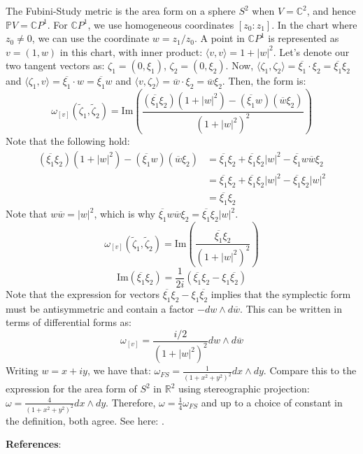 \begin{example}
The Fubini-Study metric is the area form on a sphere $S^{2}$ when $V = \mathbb{C}^2$, and hence $\mathbb{P}V = \mathbb{C}P^{1}$.
For $\mathbb{C}P^1$, we use homogeneous coordinates $[z_0:z_1]$. In the chart where $z_0 \neq 0$, we can use the coordinate $w = z_1/z_0$. A point in $\mathbb{C}P^1$ is represented as $v = (1, w)$ in this chart, with inner product: $\langle v, v \rangle = 1 + |w|^2$. Let's denote our two tangent vectors as: $\zeta_1 = (0, \xi_1)$, $\zeta_2 = (0, \xi_2)$. Now, $\langle \zeta_1, \zeta_2 \rangle = \overline{\xi_1} \cdot \xi_2 = \overline{\xi_1} \xi_2$ and $\langle \zeta_1, v \rangle = \overline{\xi_1} \cdot w = \overline{\xi_1} w$ and $\langle v, \zeta_2 \rangle = \overline{w} \cdot \xi_2 = \overline{w} \xi_2$. Then, the form is:
\begin{equation}
\omega_{[v]}(\tilde{\zeta}_1, \tilde{\zeta}_2) = \text{Im} \left( \frac{(\overline{\xi_1} \xi_2)(1 + |w|^2) - (\overline{\xi_1} w)(\overline{w} \xi_2)}{(1 + |w|^2)^2} \right)
\end{equation}
Note that the following hold:
\begin{align}
(\overline{\xi_1} \xi_2)(1 + |w|^2) - (\overline{\xi_1} w)(\overline{w} \xi_2) &= \overline{\xi_1} \xi_2 + \overline{\xi_1} \xi_2 |w|^2 - \overline{\xi_1} w \overline{w} \xi_2\\
&= \overline{\xi_1} \xi_2 + \overline{\xi_1} \xi_2 |w|^2 - \overline{\xi_1} \xi_2 |w|^2\\
&= \overline{\xi_1} \xi_2
\end{align}
Note that $w \overline{w} = |w|^2$, which is why $\overline{\xi_1} w \overline{w} \xi_2 = \overline{\xi_1} \xi_2 |w|^2$.
\begin{equation}
\omega_{[v]}(\tilde{\zeta}_1, \tilde{\zeta}_2) = \text{Im} \left( \frac{\overline{\xi_1} \xi_2}{(1 + |w|^2)^2} \right)
\end{equation}
\begin{equation}
\text{Im}(\overline{\xi_1} \xi_2) = \frac{1}{2i}(\overline{\xi_1} \xi_2 - \xi_1 \overline{\xi_2})
\end{equation}
Note that the expression for vectors $\overline{\xi_1} \xi_2 - \xi_1 \overline{\xi_2}$ implies that the symplectic form must be antisymmetric and contain a factor $- dw \wedge d\overline{w}$. This can be written in terms of differential forms as:
\begin{equation}
\omega_{[v]} = \frac{i/2}{(1 + |w|^2)^2} dw \wedge d\overline{w}
\end{equation}
Writing $w = x + iy$, we have that: $\omega_{FS} = \frac{1}{(1 + x^2 + y^2)^2} dx \wedge dy$. Compare this to the expression for the area form of $S^{2}$ in $\mathbb{R}^2$ using stereographic projection: $\omega = \frac{4}{(1 + x^2 + y^2)^2} dx \wedge dy$. Therefore, $\omega = \frac{1}{4} \omega_{FS}$ and up to a choice of constant in the definition, both agree. See here: \textcite{Silva2001}. 
\end{example}

\noindent \textbf{References}: \textcite{Silva2001}



\newpage
\setcounter{section}{5}








